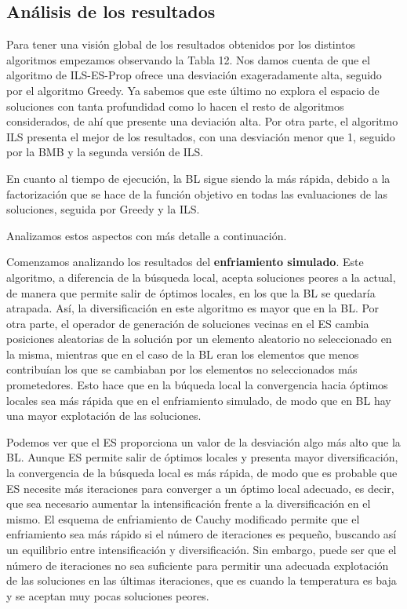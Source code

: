 \documentclass[11pt,a4paper]{article}
\begin{document}
	\subsection{Análisis de los resultados}
	
	Para tener una visión global de los resultados obtenidos por los distintos algoritmos empezamos observando la Tabla 12. Nos damos cuenta de que el algoritmo de ILS-ES-Prop ofrece una desviación exageradamente alta, seguido por el algoritmo Greedy. Ya sabemos que este último no explora el espacio de soluciones con tanta profundidad como lo hacen el resto de algoritmos considerados, de ahí que presente una deviación alta. Por otra parte, el algoritmo ILS presenta el mejor de los resultados, con una desviación menor que 1, seguido por la BMB y la segunda versión de ILS. 
	
	En cuanto al tiempo de ejecución, la BL sigue siendo la más rápida, debido a la factorización que se hace de la función objetivo en todas las evaluaciones de las soluciones, seguida por Greedy y la ILS. 
	
	Analizamos estos aspectos con más detalle a continuación.
	
	Comenzamos analizando los resultados del \textbf{enfriamiento simulado}. Este algoritmo, a diferencia de la búsqueda local, acepta soluciones peores a la actual, de manera que permite salir de óptimos locales, en los que la BL se quedaría atrapada. Así, la diversificación en este algoritmo es mayor que en la BL. Por otra parte, el operador de generación de soluciones vecinas en el ES cambia posiciones aleatorias de la solución por un elemento aleatorio no seleccionado en la misma, mientras que en el caso de la BL eran los elementos que menos contribuían los que se cambiaban por los elementos no seleccionados más prometedores.  Esto hace que en la búqueda local la convergencia hacia óptimos locales sea más rápida que en el enfriamiento simulado, de modo que en BL hay una mayor explotación de las soluciones. 
	
	Podemos ver que el ES proporciona un valor de la desviación algo más alto que la BL. Aunque ES permite salir de óptimos locales y presenta mayor diversificación, la convergencia de la búsqueda local es más rápida, de modo que es probable que ES necesite más iteraciones para converger a un óptimo local adecuado, es decir, que sea necesario aumentar la intensificación frente a la diversificación en el mismo. El esquema de enfriamiento de Cauchy modificado permite que el enfriamiento sea más rápido si el número de iteraciones es pequeño, buscando así un equilibrio entre intensificación y diversificación. Sin embargo, puede ser que el número de iteraciones no sea suficiente para permitir una adecuada explotación de las soluciones en las últimas iteraciones, que es cuando la temperatura es baja y se aceptan muy pocas soluciones peores. 
	
\end{document}
